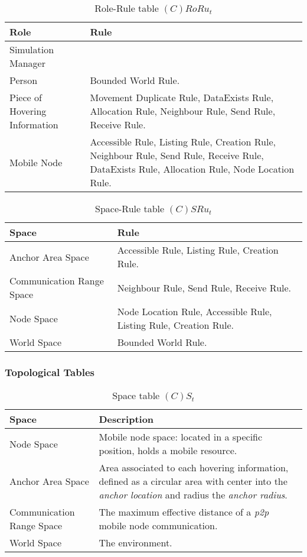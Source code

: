 \begin{table}[H]
	\centering
	\begin{tabular}{|p{4cm}|p{8cm}|}
			\hline
			\textbf{Role} & \textbf{Rule} \\
			\hline
			Simulation Manager & \\
			\hline
			Person & Bounded World Rule. \\
			\hline
      Piece of Hovering Information &  Movement Duplicate Rule, DataExists
      Rule, Allocation Rule, Neighbour Rule, Send Rule, Receive Rule.  \\
			\hline
      Mobile Node & Accessible Rule, Listing Rule, Creation Rule, Neighbour
      Rule, Send Rule, Receive Rule, DataExists Rule, Allocation Rule, Node
      Location Rule. \\
			\hline
		\end{tabular}
	\caption{Role-Rule table $(C)RoRu_t$}
	\label{tab:crorut}
\end{table}

\begin{table}[H]
	\centering
	\begin{tabular}{|p{4cm}|p{8cm}|}
			\hline
			\textbf{Space} & \textbf{Rule} \\
			\hline
			Anchor Area Space & Accessible Rule, Listing Rule, Creation Rule. \\
			\hline
			Communication Range Space & Neighbour Rule, Send Rule, Receive Rule. \\
			\hline
			Node Space & Node Location Rule, Accessible Rule, Listing Rule, Creation Rule. \\
			\hline
			World Space & Bounded World Rule. \\
			\hline
		\end{tabular}
	\caption{Space-Rule table $(C)SRu_t$}
	\label{tab:cot}
\end{table}

\subsubsection{Topological Tables}

\begin{table}[H]
	\centering
	\begin{tabular}{|p{4cm}|p{8cm}|}
			\hline
			\textbf{Space} & \textbf{Description} \\
			\hline
			Node Space & Mobile node space: located in a specific position, holds a
			mobile resource. \\
			\hline
			Anchor Area Space & Area associated to each hovering information, defined as a
			circular area with center into the \emph{anchor location} and radius the
			\emph{anchor radius}.\\
			\hline
			Communication Range Space & The maximum effective distance of a \emph{p2p}
			mobile node communication. \\
			\hline
			World Space & The environment. \\
			\hline
		\end{tabular}
	\caption{Space table $(C)S_t$}
	\label{tab:st}
\end{table}


